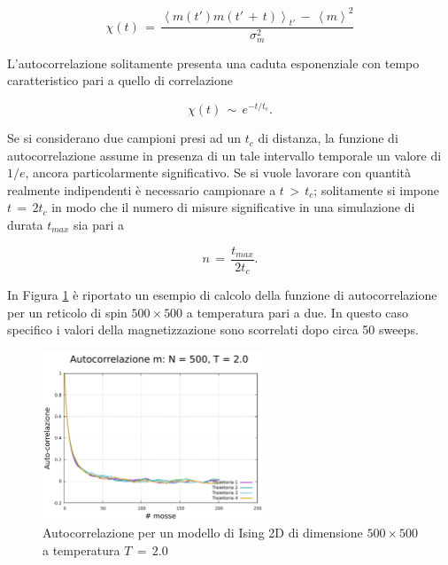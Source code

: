 \begin{equation}
    \chi\left(t\right)\,=\,\frac{\left<m\left(t'\right)m\left(t'\,+\,t\right)\right>_{t'}\,-\,\left<m\right>^2}{\sigma^2_m}
    \label{eq: auto_corr_m}
\end{equation}

L'autocorrelazione solitamente presenta una caduta esponenziale con tempo caratteristico pari a quello di correlazione

\begin{equation}
    \chi\left(t\right)\,\sim\,e^{-t/t_c}.
    \label{eq: auto_corr_cad_exp}
\end{equation}

Se si considerano due campioni presi ad un $t_c$ di distanza, la funzione di autocorrelazione assume in presenza di un tale 
intervallo temporale un valore di $1/e$, ancora particolarmente significativo. Se si vuole lavorare con quantità realmente indipendenti 
è necessario campionare a $t\,>\,t_c$; solitamente si impone $t\,=\,2t_c$ in modo che il numero di misure significative in una 
simulazione di durata $t_{max}$ sia pari a 

\begin{equation}
    n\,=\,\frac{t_{max}}{2 t_c}.
    \label{eq: num_ind_samp}
\end{equation}

In Figura \ref{fig: autocorr_Ising_ex} è riportato un esempio di calcolo della funzione di autocorrelazione per un reticolo di spin 
$500 \times 500$ a temperatura pari a due. In questo caso specifico i valori della magnetizzazione sono scorrelati dopo circa 50 sweeps.

\begin{figure}[H]
    \centering
    \includegraphics[width=0.6\textwidth]{Immagini/MC_meth/auto_500_2.0.pdf}
    \caption{Autocorrelazione per un modello di Ising 2D di dimensione $500 \times 500$ a temperatura $T\,=\,2.0$}
    \label{fig: autocorr_Ising_ex}
\end{figure}



